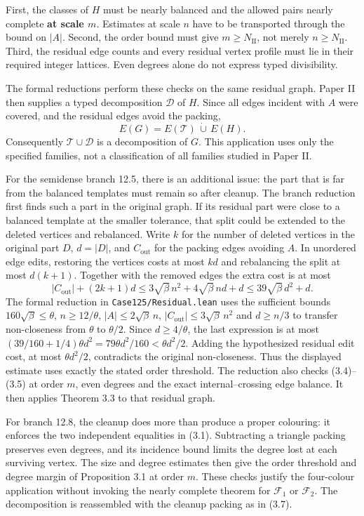 \documentclass[english,11pt,a4paper]{article}
\begin{document}
First, the classes of \(H\) must be nearly balanced and the allowed pairs nearly complete \textbf{at scale \(m\)}. Estimates at scale \(n\) have to be transported through the bound on \(|A|\). Second, the order bound must give \(m\ge N_{\mathrm{II}}\), not merely \(n\ge N_{\mathrm{II}}\). Third, the residual edge counts and every residual vertex profile must lie in their required integer lattices. Even degrees alone do not express typed divisibility.

The formal reductions perform these checks on the same residual graph. Paper II then supplies a typed decomposition \(\mathcal D\) of \(H\). Since all edges incident with \(A\) were covered, and the residual edges avoid the packing, \[E(G)=E(\mathcal T)\,\dot\cup\,E(H).
\tag{3.7}\] Consequently \(\mathcal T\cup\mathcal D\) is a decomposition of \(G\). This application uses only the specified families, not a classification of all families studied in Paper II.

For the semidense branch 12.5, there is an additional issue: the part that is far from the balanced templates must remain so after cleanup. The branch reduction first finds such a part in the original graph. If its residual part were close to a balanced template at the smaller tolerance, that split could be extended to the deleted vertices and rebalanced. Write \(k\) for the number of deleted vertices in the original part \(D\), \(d=|D|\), and \(C_{\mathrm{out}}\) for the packing edges avoiding \(A\). In unordered edge edits, restoring the vertices costs at most \(kd\) and rebalancing the split at most \(d(k+1)\). Together with the removed edges the extra cost is at most \[|C_{\mathrm{out}}|+(2k+1)d
\le 3\sqrt\beta\,n^2+4\sqrt\beta\,nd+d\le39\sqrt\beta\,d^2+d.\] The formal reduction in \texttt{Case125/\allowbreak{}Residual.\allowbreak{}lean} uses the sufficient bounds \(160\sqrt\beta\le\theta\), \(n\ge12/\theta\), \(|A|\le2\sqrt\beta\,n\), \(|C_{\mathrm{out}}|\le3\sqrt\beta\,n^2\) and \(d\ge n/3\) to transfer non-closeness from \(\theta\) to \(\theta/2\). Since \(d\ge4/\theta\), the last expression is at most \((39/160+1/4)\theta d^2=79\theta d^2/160<\theta d^2/2\). Adding the hypothesized residual edit cost, at most \(\theta d^2/2\), contradicts the original non-closeness. Thus the displayed estimate uses exactly the stated order threshold. The reduction also checks (3.4)--(3.5) at order \(m\), even degrees and the exact internal--crossing edge balance. It then applies Theorem 3.3 to that residual graph.

For branch 12.8, the cleanup does more than produce a proper colouring: it enforces the two independent equalities in (3.1). Subtracting a triangle packing preserves even degrees, and its incidence bound limits the degree lost at each surviving vertex. The size and degree estimates then give the order threshold and degree margin of Proposition 3.1 at order \(m\). These checks justify the four-colour application without invoking the nearly complete theorem for \(\mathcal F_1\) or \(\mathcal F_2\). The decomposition is reassembled with the cleanup packing as in (3.7).
\end{document}
